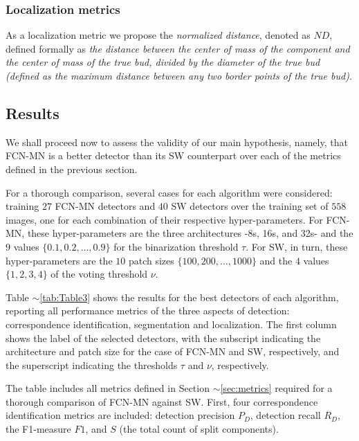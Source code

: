 \documentclass[a4paper,authoryear,review]{elsarticle}
\begin{document}
	\subsubsection{Localization metrics}
	\label{subsec:locmetrics}
	
	As a localization metric we propose the \emph{normalized distance}, denoted as $ND$, defined formally as \emph{the distance between the center of mass of the component and the center of mass of the true bud, divided by the diameter of the true bud (defined as the maximum distance between any two border points of the true bud)}.
	
	\subsection{Results}
	\label{sec:resultados}
	
	We shall proceed now to assess the validity of our main hypothesis, namely, that FCN-MN is a better detector than its SW counterpart over each of the metrics defined in the previous section. 
	
	For a thorough comparison, several cases for each algorithm  were considered: training $27$ FCN-MN detectors and $40$ SW detectors over the training set of $558$ images, one for each combination of their respective hyper-parameters. For FCN-MN, these hyper-parameters are the three architectures -8s, 16s, and 32s- and the $9$ values $\{0.1, 0.2, \ldots, 0.9\}$ for the binarization threshold $\tau$. For SW, in turn, these hyper-parameters are the $10$ patch sizes $\{100, 200, \ldots, 1000\}$  and the $4$ values $\{1, 2, 3, 4\}$  of the voting threshold $\nu$.
	
	Table $\sim$\ref{tab:Table3} shows the results for the best detectors of each algorithm, reporting all performance metrics of the three aspects of detection: correspondence identification, segmentation and localization. The first column shows the label of the selected detectors, with the subscript indicating the architecture and patch size for the case of FCN-MN and SW, respectively, and the superscript indicating the thresholds $\tau$ and $\nu$, respectively.
	
	The table includes all metrics defined in Section $\sim$\ref{sec:metrics} required for a thorough comparison of FCN-MN against SW. First, four correspondence identification metrics are included: detection precision $P_D$, detection recall $R_D$, the F1-measure  $F1$, and $S$ (the total count of split components). 
	
\end{document}
